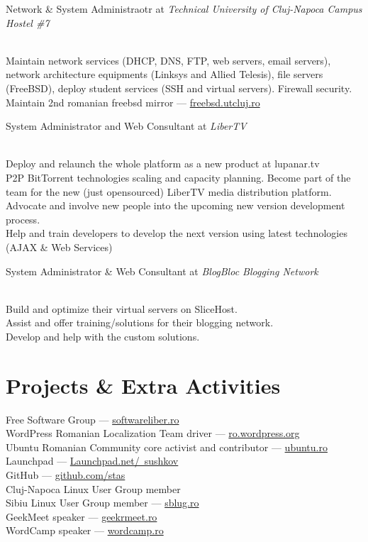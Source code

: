 \documentclass[10pt, a4paper]{article}
\newcommand{\years}[1]{\marginnote{\scriptsize #1}}
\begin{document}
\years{2008-2009}Network \& System Administraotr at \emph{Technical University of Cluj-Napoca Campus Hostel \#7}
\begin{footnotesize}
\\
Maintain network services (DHCP, DNS, FTP, web servers, email servers), network architecture equipments (Linksys and Allied Telesis), file servers (FreeBSD), deploy student services (SSH and virtual servers). Firewall security.\\
Maintain 2nd romanian freebsd mirror --- \href{http://freebsd.utcluj.ro}{freebsd.utcluj.ro}
\end{footnotesize}

\years{2008-2009}System Administrator and Web Consultant at \emph{LiberTV}
\begin{footnotesize}
\\
Deploy and relaunch the whole platform as a new product at lupanar.tv\\
P2P BitTorrent technologies scaling and capacity planning.
Become part of the team for the new (just opensourced) LiberTV media distribution platform.\\
Advocate and involve new people into the upcoming new version development process.\\
Help and train developers to develop the next version using latest technologies (AJAX \& Web Services)
\end{footnotesize}

\years{2008}System Administrator \& Web Consultant at \emph{BlogBloc Blogging Network}
\begin{footnotesize}
\\
Build and optimize their virtual servers on SliceHost.\\
Assist and offer training/solutions for their blogging network.\\
Develop and help with the custom solutions.
\end{footnotesize}

\section*{Projects \& Extra Activities}
Free Software Group --- \href{http://softwareliber.ro}{softwareliber.ro}\\
WordPress Romanian Localization Team driver --- \href{http://ro.wordpress.org}{ro.wordpress.org}\\
Ubuntu Romanian Community core activist and contributor --- \href{http://ubuntu.ro}{ubuntu.ro}\\
Launchpad --- \href{http://launchpad.net/~sushkov}{Launchpad.net/~sushkov}\\
GitHub --- \href{http://github.com/stas/}{github.com/stas}\\
Cluj-Napoca Linux User Group member\\
Sibiu Linux User Group member --- \href{http://sblug.ro}{sblug.ro}\\
GeekMeet speaker --- \href{http://geekmeet.ro}{geekrmeet.ro}\\
WordCamp speaker --- \href{http://wordcamp.ro}{wordcamp.ro}
\end{document}

